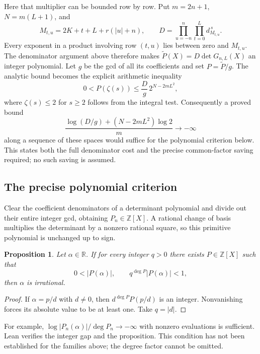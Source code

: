 \documentclass[11pt]{article}
\newtheorem{proposition}[theorem]{Proposition}
\newcommand{\Z}{\mathbb Z}
\newcommand{\R}{\mathbb R}
\begin{document}
Here that multiplier can be bounded row by row. Put $m=2n+1$,
$N=m(L+1)$, and
\[
 M_{t,u}=2K+t+L+r(|u|+n),\qquad
 D=\prod_{u=-n}^{n}\prod_{t=0}^{L}d_{M_{t,u}}^{\,s}.
\]
Every exponent in a product involving row $(t,u)$ lies between zero
and $M_{t,u}$. The denominator argument above therefore makes
$\widetilde P(X)=D\det G_{n,L}(X)$ an integer polynomial.
Let $g$ be the gcd of all its coefficients and set $P=\widetilde P/g$.
The analytic bound becomes the explicit arithmetic inequality
\begin{equation}
 0<P(\zeta(s))\le \frac Dg\,2^{N-2mL^2},
 \label{eq:mellinbudget}
\end{equation}
where $\zeta(s)\le2$ for $s\ge2$ follows from the integral test.
Consequently a proved bound
\[
 \frac{\log(D/g)+(N-2mL^2)\log2}{m}\longrightarrow-\infty
\]
along a sequence of these spaces would suffice for the polynomial
criterion below. This states both the full denominator cost and the
precise common-factor saving required; no such saving is assumed.

\subsection{The precise polynomial criterion}
Clear the coefficient denominators of a determinant polynomial and
divide out their entire integer gcd, obtaining $P_n\in\Z[X]$.
A rational change of basis multiplies the determinant by a nonzero
rational square, so this primitive polynomial is unchanged up to sign.

\begin{proposition}
Let $\alpha\in\R$. If for every integer $q>0$ there exists $P\in\Z[X]$
such that
\[
 0<|P(\alpha)|,\qquad q^{\deg P}|P(\alpha)|<1,
\]
then $\alpha$ is irrational.
\end{proposition}
\begin{proof}
If $\alpha=p/d$ with $d\ne0$, then
$d^{\deg P}P(p/d)$ is an integer. Nonvanishing forces its absolute value
to be at least one. Take $q=|d|$.
\end{proof}
For example, $\log|P_n(\alpha)|/\deg P_n\to-\infty$ with nonzero
evaluations is sufficient. Lean verifies the integer gap and the
proposition. This condition has not been established for the families
above; the degree factor cannot be omitted.
\end{document}
